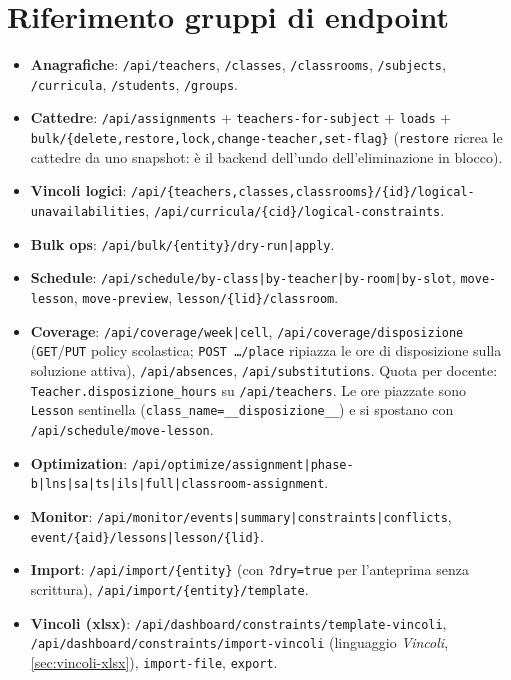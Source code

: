 \section{Riferimento gruppi di endpoint}

\begin{itemize}
  \item \textbf{Anagrafiche}: \texttt{/api/teachers},
        \texttt{/classes}, \texttt{/classrooms},
        \texttt{/subjects}, \texttt{/curricula},
        \texttt{/students}, \texttt{/groups}.
  \item \textbf{Cattedre}: \texttt{/api/assignments} +
        \texttt{teachers-for-subject} + \texttt{loads} +
        \texttt{bulk/\{delete,restore,lock,change-teacher,set-flag\}}
        (\texttt{restore} ricrea le cattedre da uno snapshot: \`e il
        backend dell'undo dell'eliminazione in blocco).
  \item \textbf{Vincoli logici}:
        \texttt{/api/\{teachers,classes,classrooms\}/\{id\}/logical-unavailabilities},
        \texttt{/api/curricula/\{cid\}/logical-constraints}.
  \item \textbf{Bulk ops}:
        \texttt{/api/bulk/\{entity\}/dry-run|apply}.
  \item \textbf{Schedule}:
        \texttt{/api/schedule/by-class|by-teacher|by-room|by-slot},
        \texttt{move-lesson}, \texttt{move-preview},
        \texttt{lesson/\{lid\}/classroom}.
  \item \textbf{Coverage}: \texttt{/api/coverage/week|cell},
        \texttt{/api/coverage/disposizione}
        (\texttt{GET}/\texttt{PUT} policy scolastica;
        \texttt{POST \ldots/place} ripiazza le ore di
        disposizione sulla soluzione attiva),
        \texttt{/api/absences}, \texttt{/api/substitutions}.
        Quota per docente: \texttt{Teacher.disposizione\_hours}
        su \texttt{/api/teachers}. Le ore piazzate sono
        \texttt{Lesson} sentinella
        (\texttt{class\_name=\_\_disposizione\_\_}) e si
        spostano con \texttt{/api/schedule/move-lesson}.
  \item \textbf{Optimization}:
        \texttt{/api/optimize/assignment|phase-b|lns|sa|ts|ils|full|classroom-assignment}.
  \item \textbf{Monitor}: \texttt{/api/monitor/events|summary|constraints|conflicts},
        \texttt{event/\{aid\}/lessons|lesson/\{lid\}}.
  \item \textbf{Import}: \texttt{/api/import/\{entity\}}
        (con \texttt{?dry=true} per l'anteprima senza scrittura),
        \texttt{/api/import/\{entity\}/template}.
  \item \textbf{Vincoli (xlsx)}:
        \texttt{/api/dashboard/constraints/template-vincoli},
        \texttt{/api/dashboard/constraints/import-vincoli}
        (linguaggio \emph{Vincoli}, \cref{sec:vincoli-xlsx}),
        \texttt{import-file}, \texttt{export}.
\end{itemize}

